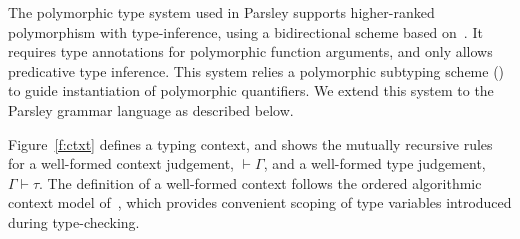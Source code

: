 \documentclass[letterpaper]{article}
\begin{document}
The polymorphic type system used in Parsley supports higher-ranked
polymorphism with type-inference, using a bidirectional scheme based
on~\cite{Dunfield13:bidir}.  It requires type annotations for
polymorphic function arguments, and only allows predicative type
inference.  This system relies a polymorphic subtyping scheme
(\cite{odersky96}) to guide instantiation of polymorphic quantifiers.
We extend this system to the Parsley grammar language as described
below.

Figure~\ref{f:ctxt} defines a typing context, and shows the mutually
recursive rules for a well-formed context judgement, $\vdash\Gamma$,
and a well-formed type judgement, $\Gamma\vdash\tau$.  The definition
of a well-formed context follows the ordered algorithmic context model
of~\cite{zhao2018,zhao19:bidir,Dunfield13:bidir}, which provides
convenient scoping of type variables introduced during type-checking.
\end{document}
